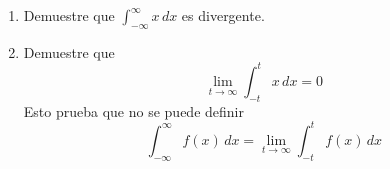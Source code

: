 \item 
    \begin{enumerate}
        \item[(a)] Demuestre que $\int_{-\infty}^{\infty} x \, dx$ es divergente.
        \item[(b)] Demuestre que
        \[ \lim_{t \to \infty} \int_{-t}^{t} x \, dx = 0 \]
        Esto prueba que no se puede definir
        \[ \int_{-\infty}^{\infty} f(x) \, dx = \lim_{t \to \infty} \int_{-t}^{t} f(x) \, dx \]
    \end{enumerate}
